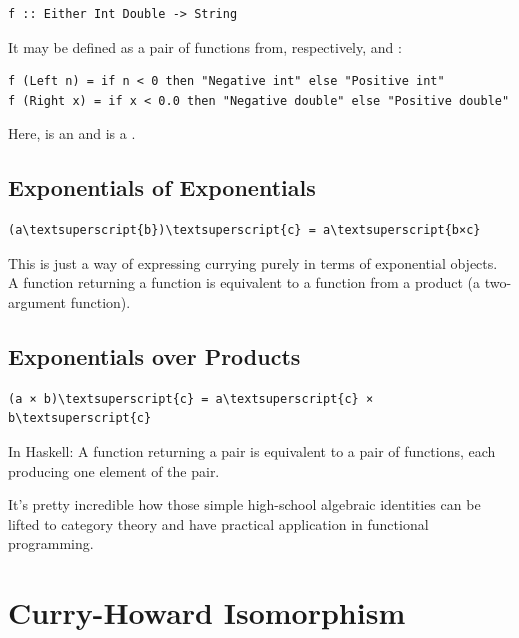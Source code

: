 \begin{Verbatim}[commandchars=\\\{\}]
f :: Either Int Double -> String
\end{Verbatim}
It may be defined as a pair of functions from, respectively,
 and :

\begin{verbatim}
f (Left n) = if n < 0 then "Negative int" else "Positive int"
f (Right x) = if x < 0.0 then "Negative double" else "Positive double"
\end{verbatim}
Here,  is an  and  is a .

\subsection{Exponentials of
Exponentials}\label{exponentials-of-exponentials}

\begin{Verbatim}[commandchars=\\\{\}]
(a\textsuperscript{b})\textsuperscript{c} = a\textsuperscript{b×c}
\end{Verbatim}
This is just a way of expressing currying purely in terms of exponential
objects. A function returning a function is equivalent to a function
from a product (a two-argument function).

\subsection{Exponentials over
Products}\label{exponentials-over-products}

\begin{Verbatim}[commandchars=\\\{\}]
(a × b)\textsuperscript{c} = a\textsuperscript{c} × b\textsuperscript{c}
\end{Verbatim}
In Haskell: A function returning a pair is equivalent to a pair of
functions, each producing one element of the pair.

It's pretty incredible how those simple high-school algebraic identities
can be lifted to category theory and have practical application in
functional programming.

\section{Curry-Howard Isomorphism}\label{curry-howard-isomorphism}

